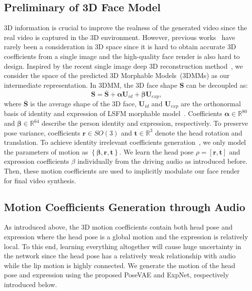 \subsection{Preliminary of 3D Face Model}
\label{sec:preliminary}
3D information is crucial to improve the realness of the generated video since the real video is captured in the 3D environment. However, previous works~\cite{pcavs, wav2lip, zhou2020makelttalk} have rarely been a consideration in 3D space since it is hard to obtain accurate 3D coefficients from a single image and the high-quality face render is also hard to design. 
Inspired by the recent single image deep 3D reconstruction method~\cite{deng2019accurate}, we consider the space of the predicted 3D Morphable Models~(3DMMs) as our intermediate representation.
In 3DMM, the 3D face shape $\mathbf{S}$ can be decoupled as:
\begin{equation}
\mathbf{S} = \overline{\mathbf{S}} + \mathbf{\alpha} \mathbf{U}_{id} + \mathbf{\beta} \mathbf{U}_{exp},
\end{equation}
where $\overline{\mathbf{S}}$ is the average shape of the 3D face, $\mathbf{U}_{id}$ and $\mathbf{U}_{exp}$ are the orthonormal basis of identity and expression of LSFM morphable model~\cite{3dmm}. 
Coefficients $\mathbf{\alpha} \in \mathbb{R}^{80}$ and $\mathbf{\beta} \in \mathbb{R}^{64}$ describe the person identity and expression, respectively. 
To preserve pose variance, coefficients $\mathbf{r} \in SO(3)$ and $\mathbf{t} \in \mathbb{R}^{3}$ denote the head rotation and translation. To achieve identity irrelevant coefficients generation~\cite{ren2021pirenderer}, we only model the parameters of motion as $ \left \{ \mathbf{\beta}, \mathbf{r}, \mathbf{t} \right \}$. We learn the head pose $ \rho = [\mathbf{r}, \mathbf{t}]$ and expression coefficients $\beta$ individually from the driving audio as introduced before. Then, these motion coefficients are used to implicitly modulate our face render for final video synthesis. 

\subsection{Motion Coefficients Generation through Audio}
\label{sec:audio2coeff}
As introduced above, the 3D motion coefficients contain both head pose and expression where the head pose is a global motion and the expression is relatively local. To this end, learning everything altogether will cause huge uncertainty in the network since the head pose has a relatively weak relationship with audio while the lip motion is highly connected.
We generate the motion of the head pose and expression using the proposed PoseVAE and ExpNet, respectively introduced below. 

